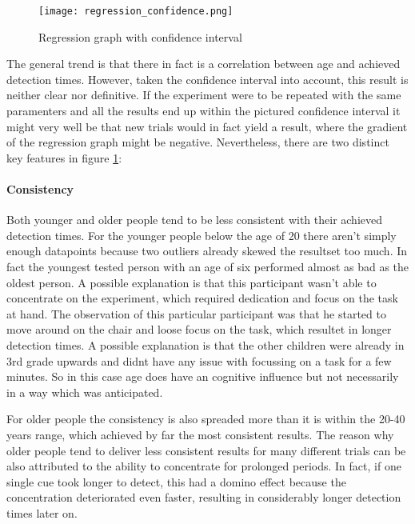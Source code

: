            \begin{figure}[h]     %
                \centering
                \texttt{[image: regression\_confidence.png]}
                \caption{Regression graph with confidence interval}\label{regression}
            \end{figure}

            The general trend is that there in fact is a correlation between age and achieved detection times. However, taken the confidence interval into account, this result is neither clear nor definitive. If the experiment were to be repeated with the same paramenters and all the results end up within the pictured confidence interval it might very well be that new trials would in fact yield a result, where the gradient of the regression graph might be negative. Nevertheless, there are two distinct key features in figure \ref*{regression}:
            
            \paragraph{Consistency} Both younger and older people tend to be less consistent with their achieved detection times. For the younger people below the age of 20 there aren't simply enough datapoints because two outliers already skewed the resultset too much. In fact the youngest tested person with an age of six performed almost as bad as the oldest person. A possible explanation is that this participant wasn't able to concentrate on the experiment, which required dedication and focus on the task at hand. The observation of this particular participant was that he started to move around on the chair and loose focus on the task, which resultet in longer detection times. A possible explanation is that the other children were already in 3rd grade upwards and didnt have any issue with focussing on a task for a few minutes. So in this case age does have an cognitive influence but not necessarily in a way which was anticipated. 

            For older people the consistency is also spreaded more than it is within the 20-40 years range, which achieved by far the most consistent results. The reason why older people tend to deliver less consistent results for many different trials can be also attributed to the ability to concentrate for prolonged periods. In fact, if one single cue took longer to detect, this had a domino effect because the concentration deteriorated even faster, resulting in considerably longer detection times later on. 
            

